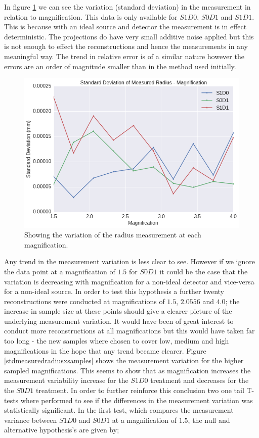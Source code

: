 \documentclass[
  twoside,
  11pt, a4paper,
  footinclude=true,
  headinclude=true,
  cleardoublepage=empty
]{scrbook}
\begin{document}
In figure \ref{stdmeasuredradius} we can see the variation (standard deviation) in the measurement in relation to magnification. This data is only available for $S1D0$, $S0D1$ and $S1D1$. This is because with an ideal source and detector the measurement is in effect deterministic. The projections do have very small additive noise applied but this is not enough to effect the reconstructions and hence the measurements in any meaningful way. The trend in relative error is of a similar nature however the errors are an order of magnitude smaller than in the method used initially.

\begin{figure}[h!]
  \centering
    \includegraphics[width=\textwidth]{figures/output_14_0.png}
    \caption{Showing the variation of the radius measurement at each magnification.}
        \label{stdmeasuredradius}
\end{figure}

Any trend in the measurement variation is less clear to see. However if we ignore the data point at a magnification of $1.5$ for $S0D1$ it could be the case that the variation is decreasing with magnification for a non-ideal detector and vice-versa for a non-ideal source. In order to test this hypothesis a further twenty reconstructions were conducted at magnifications of $1.5$, $2.0556$ and $4.0$; the increase in sample size at these points should give a clearer picture of the underlying measurement variation. It would have been of great interest to conduct more reconstructions at all magnifications but this would have taken far too long - the new samples where chosen to cover low, medium and high magnifications in the hope that any trend became clearer. Figure \ref{stdmeasuredradiusxsamples} shows the measurement variation for the higher sampled magnifications. This seems to show that as magnification increases the measurement variability increase for the $S1D0$ treatment and decreases for the the $S0D1$ treatment. In order to further reinforce this conclusion two one tail T-tests where performed to see if the differences in the measurement variation was statistically significant. In the first test, which compares the measurement variance between $S1D0$ and  $S0D1$ at a magnification of $1.5$, the null and alternative hypothesis's are given by;
\end{document}
